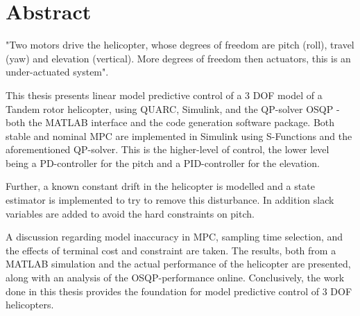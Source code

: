 \clearpage
				


\chapter*{Abstract}



"Two motors drive the helicopter, whose degrees of freedom are pitch (roll), travel (yaw) and elevation (vertical). More degrees of freedom then actuators, this is an under-actuated system". 


This thesis presents linear model predictive control of a 3 DOF model of a Tandem rotor helicopter, using QUARC, Simulink, and the QP-solver OSQP - both the MATLAB interface and the code generation software package. Both stable and nominal MPC are implemented in Simulink using S-Functions and the aforementioned QP-solver. This is the higher-level of control, the lower level being a PD-controller for the pitch and a PID-controller for the elevation.

Further, a known constant drift in the helicopter is modelled and a state estimator is implemented to try to remove this disturbance. In addition slack variables are added to avoid the  hard constraints on pitch. 

A discussion regarding model inaccuracy in MPC, sampling time selection, and the effects of terminal cost and constraint are taken. The results, both from a MATLAB simulation and the actual performance of the helicopter are presented, along with an analysis of the OSQP-performance online. Conclusively, the work done in this thesis provides the foundation for model predictive control of 3 DOF helicopters. 
